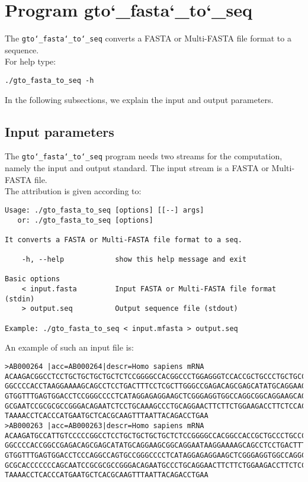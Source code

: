 \section{Program gto\char`_fasta\char`_to\char`_seq}
The \texttt{gto\char`_fasta\char`_to\char`_seq} converts a FASTA or Multi-FASTA file format to a sequence.\\
For help type:
\begin{lstlisting}
./gto_fasta_to_seq -h
\end{lstlisting}
In the following subsections, we explain the input and output parameters.

\subsection*{Input parameters}

The \texttt{gto\char`_fasta\char`_to\char`_seq} program needs two streams for the computation, namely the input and output standard. The input stream is a FASTA or Multi-FASTA file.\\
The attribution is given according to:
\begin{lstlisting}
Usage: ./gto_fasta_to_seq [options] [[--] args]
   or: ./gto_fasta_to_seq [options]

It converts a FASTA or Multi-FASTA file format to a seq.

    -h, --help            show this help message and exit

Basic options
    < input.fasta         Input FASTA or Multi-FASTA file format (stdin)
    > output.seq          Output sequence file (stdout)

Example: ./gto_fasta_to_seq < input.mfasta > output.seq
\end{lstlisting}
An example of such an input file is:
\begin{lstlisting}
>AB000264 |acc=AB000264|descr=Homo sapiens mRNA 
ACAAGACGGCCTCCTGCTGCTGCTGCTCTCCGGGGCCACGGCCCTGGAGGGTCCACCGCTGCCCTGCTGCCATTGTCCCC
GGCCCCACCTAAGGAAAAGCAGCCTCCTGACTTTCCTCGCTTGGGCCGAGACAGCGAGCATATGCAGGAAGCGGCAGGAA
GTGGTTTGAGTGGACCTCCGGGCCCCTCATAGGAGAGGAAGCTCGGGAGGTGGCCAGGCGGCAGGAAGCAGGCCAGTGCC
GCGAATCCGCGCGCCGGGACAGAATCTCCTGCAAAGCCCTGCAGGAACTTCTTCTGGAAGACCTTCTCCACCCCCCCAGC
TAAAACCTCACCCATGAATGCTCACGCAAGTTTAATTACAGACCTGAA
>AB000263 |acc=AB000263|descr=Homo sapiens mRNA 
ACAAGATGCCATTGTCCCCCGGCCTCCTGCTGCTGCTGCTCTCCGGGGCCACGGCCACCGCTGCCCTGCCCCTGGAGGGT
GGCCCCACCGGCCGAGACAGCGAGCATATGCAGGAAGCGGCAGGAATAAGGAAAAGCAGCCTCCTGACTTTCCTCGCTTG
GTGGTTTGAGTGGACCTCCCAGGCCAGTGCCGGGCCCCTCATAGGAGAGGAAGCTCGGGAGGTGGCCAGGCGGCAGGAAG
GCGCACCCCCCCAGCAATCCGCGCGCCGGGACAGAATGCCCTGCAGGAACTTCTTCTGGAAGACCTTCTCCTCCTGCAAA
TAAAACCTCACCCATGAATGCTCACGCAAGTTTAATTACAGACCTGAA
\end{lstlisting}

